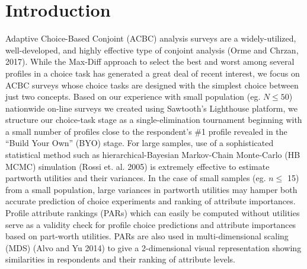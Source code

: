 \documentclass[a4paper, 12pt]{article}
\begin{document}


 \vspace{1in}

\section{Introduction}

Adaptive Choice-Based Conjoint (ACBC) analysis surveys are a widely-utilized, well-developed, and highly effective  type of conjoint analysis (Orme and Chrzan, 2017). While the Max-Diff approach to select the best and worst among several profiles in a choice task has generated a great deal of recent interest, we focus on ACBC surveys whose choice tasks are designed with the  simplest choice between just two concepts. Based on our experience with small population  (eg. $N\le 50$) nationwide on-line surveys we created using Sawtooth's Lighthouse platform, we structure our choice-task stage as a single-elimination tournament beginning with a small number of profiles close to the respondent's \#1 profile revealed in the  ``Build Your Own'' (BYO) stage. For large samples, use of a sophisticated statistical method such as hierarchical-Bayesian Markov-Chain Monte-Carlo (HB MCMC) simulation (Rossi et. al. 2005) is extremely effective to estimate partworth utilities and their variances. In the case of small samples  (eg. $n \le$ 15) from a small population, large variances in partworth utilities may hamper both accurate prediction of choice experiments  and ranking of attribute importances.  Profile attribute rankings (PARs) which can easily be computed without utilities serve as a validity check for profile choice predictions and attribute importances based on part-worth utilities.  PARs are also used in  multi-dimensional scaling (MDS) (Alvo and Yu 2014) to give a 2-dimensional visual representation showing similarities in respondents and their ranking of attribute levels.
\end{document}

